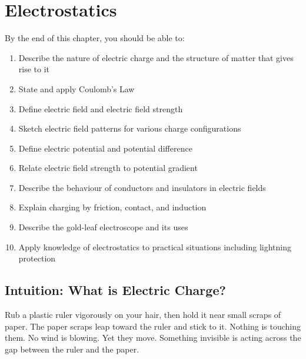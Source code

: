 %

\chapter{Electrostatics}
\label{ch:electrostatics}
\minitoc
\newpage


\begin{objectivebox}
By the end of this chapter, you should be able to:
\begin{enumerate}[noitemsep]
  \item Describe the nature of electric charge and
  the structure of matter that gives rise to it
  \item State and apply Coulomb's Law
  \item Define electric field and electric field
  strength
  \item Sketch electric field patterns for various
  charge configurations
  \item Define electric potential and potential
  difference
  \item Relate electric field strength to potential
  gradient
  \item Describe the behaviour of conductors and
  insulators in electric fields
  \item Explain charging by friction, contact,
  and induction
  \item Describe the gold-leaf electroscope and
  its uses
  \item Apply knowledge of electrostatics to
  practical situations including lightning protection
\end{enumerate}
\end{objectivebox}

\section{Intuition: What is Electric Charge?}

Rub a plastic ruler vigorously on your hair, then hold
it near small scraps of paper. The paper scraps leap
toward the ruler and stick to it. Nothing is touching
them. No wind is blowing. Yet they move. Something
invisible is acting across the gap between the ruler
and the paper.

